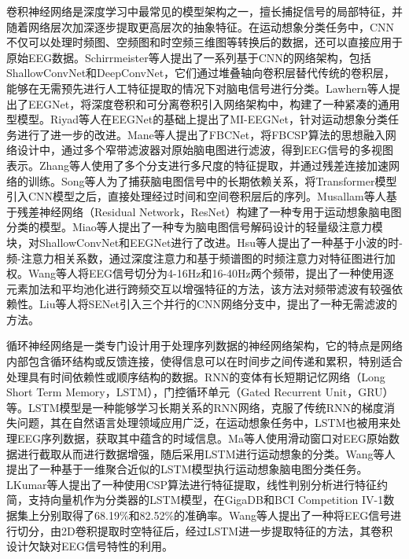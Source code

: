 卷积神经网络是深度学习中最常见的模型架构之一，擅长捕捉信号的局部特征，并随着网络层次加深逐步提取更高层次的抽象特征。在运动想象分类任务中，CNN不仅可以处理时频图、空频图和时空频三维图等转换后的数据，还可以直接应用于原始EEG数据。Schirrmeister等人\cite{schirrmeister2017deep}提出了一系列基于CNN的网络架构，包括ShallowConvNet和DeepConvNet，它们通过堆叠轴向卷积层替代传统的卷积层，能够在无需预先进行人工特征提取的情况下对脑电信号进行分类。Lawhern等人\cite{lawhern2018eegnet}提出了EEGNet，将深度卷积和可分离卷积引入网络架构中，构建了一种紧凑的通用型模型。Riyad等人\cite{riyad2021mi}在EEGNet的基础上提出了MI-EEGNet，针对运动想象分类任务进行了进一步的改进。Mane等人\cite{mane2021fbcnet}提出了FBCNet，将FBCSP算法的思想融入网络设计中，通过多个窄带滤波器对原始脑电图进行滤波，得到EEG信号的多视图表示。Zhang等人\cite{zhang2021eeg}使用了多个分支进行多尺度的特征提取，并通过残差连接加速网络的训练。Song等人\cite{song2022eeg}为了捕获脑电图信号中的长期依赖关系，将Transformer\cite{vaswani2017attention}模型引入CNN模型之后，直接处理经过时间和空间卷积层后的序列。Musallam等人\cite{musallam2021electroencephalography}基于残差神经网络（Residual Network，ResNet）\cite{he2016deep}构建了一种专用于运动想象脑电图分类的模型。Miao等人\cite{miao2023lmda}提出了一种专为脑电图信号解码设计的轻量级注意力模块，对ShallowConvNet和EEGNet进行了改进。Hsu等人\cite{10065454}提出了一种基于小波的时-频-注意力相关系数，通过深度注意力和基于频谱图的时频注意力对特征图进行加权。Wang等人\cite{wang2023ifnet}将EEG信号切分为4-16Hz和16-40Hz两个频带，提出了一种使用逐元素加法和平均池化进行跨频交互以增强特征的方法，该方法对频带滤波有较强依赖性。Liu等人\cite{liu2023compact}将SENet引入三个并行的CNN网络分支中，提出了一种无需滤波的方法。

循环神经网络是一类专门设计用于处理序列数据的神经网络架构，它的特点是网络内部包含循环结构或反馈连接，使得信息可以在时间步之间传递和累积，特别适合处理具有时间依赖性或顺序结构的数据。RNN的变体有长短期记忆网络（Long Short Term Memory，LSTM），门控循环单元（Gated Recurrent Unit，GRU）等。LSTM模型是一种能够学习长期关系的RNN网络，克服了传统RNN的梯度消失问题，其在自然语言处理领域应用广泛，在运动想象任务中，LSTM也被用来处理EEG序列数据，获取其中蕴含的时域信息。Ma等人\cite{ma2018improving}使用滑动窗口对EEG原始数据进行截取从而进行数据增强，随后采用LSTM进行运动想象的分类。Wang等人\cite{wang2018lstm}提出了一种基于一维聚合近似的LSTM模型执行运动想象脑电图分类任务。LKumar等人\cite{kumar2019brain}提出了一种使用CSP算法进行特征提取，线性判别分析进行特征约简，支持向量机作为分类器的LSTM模型，在GigaDB\cite{cho2017eeg}和BCI Competition IV-1\cite{blankertz2007non}数据集上分别取得了68.19\%和82.52\%的准确率。Wang等人\cite{wang20232d}提出了一种将EEG信号进行切分，由2D卷积提取时空特征后，经过LSTM进一步提取特征的方法，其卷积设计欠缺对EEG信号特性的利用。

